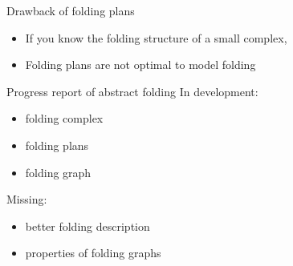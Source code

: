 \begin{frame}{Drawback of folding plans}
    \begin{itemize}
        \item<6->[$\Rightarrow$]If you know the folding structure of a small complex,
        \item<8->[$\leadsto$]Folding plans are not optimal to model folding
    \end{itemize}
\end{frame}


\begin{frame}{Progress report of abstract folding}
    \pause
    In development:
    \begin{itemize}
        \pause
        \item folding complex
        \pause
        \item folding plans
        \pause
        \item folding graph
    \end{itemize}

    \pause
    Missing:
    \begin{itemize}
        \pause
        \item better folding description
        \pause
        \item properties of folding graphs
    \end{itemize}
\end{frame}


